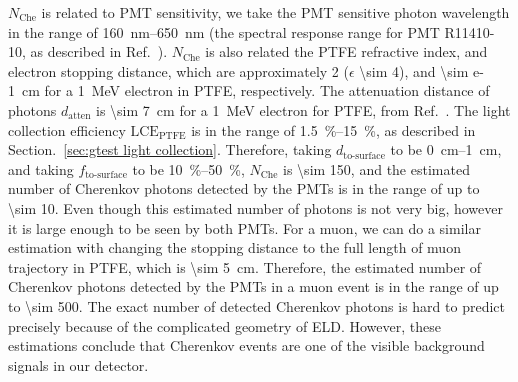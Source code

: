 $N_{\text{Che}}$ is related to PMT sensitivity, we take the PMT sensitive photon wavelength in the range of \SIrange{160}{650}{\nm} (the spectral response range for PMT R11410-10, as described in Ref.~\cite{HamamatsuPhotonics2006}). $N_{\text{Che}}$ is also related the PTFE refractive index, and electron stopping distance, which are approximately 2 ($\epsilon$ \num{\sim 4}), and \SI{\sim e-1}{\cm} for a \SI{1}{\MeV} electron in PTFE, respectively. The attenuation distance of photons $d_{\text{atten}}$ is \SI{\sim 7}{\cm} for a \SI{1}{\MeV} electron for PTFE, from Ref.~\cite{NIST}. The light collection efficiency $\text{LCE}_{\text{PTFE}}$ is in the range of \SIrange{1.5}{15}{\percent}, as described in Section.~\ref{sec:gtest light collection}. Therefore, taking $d_{\text{to-surface}}$ to be \SIrange{0}{1}{\cm}, and taking $f_{\text{to-surface}}$  to be \SIrange{10}{50}{\percent}, $N_{\text{Che}}$ is \num{\sim 150}, and the estimated number of Cherenkov photons detected by the PMTs is in the range of up to \SI{\sim 10}{\phe}. Even though this estimated number of photons is not very big, however it is large enough to be seen by both PMTs. For a muon, we can do a similar estimation with changing the stopping distance to the full length of muon trajectory in PTFE, which is \SI{\sim 5}{cm}. Therefore, the estimated number of Cherenkov photons detected by the PMTs in a muon event is in the range of up to \SI{\sim 500}{\phe}. The exact number of detected Cherenkov photons is hard to predict precisely because of the complicated geometry of ELD. However, these estimations conclude that Cherenkov events are one of the visible background signals in our detector.


